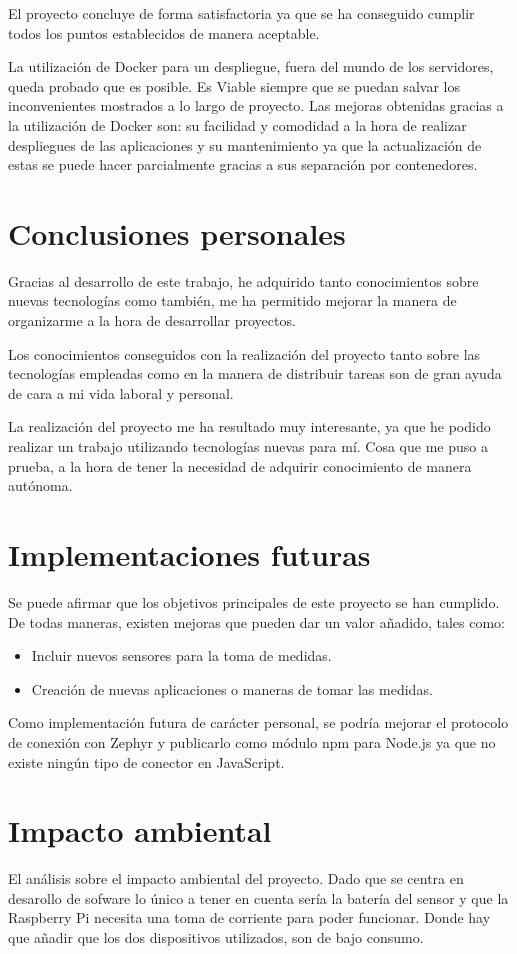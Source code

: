 El proyecto concluye de forma satisfactoria ya que se ha conseguido cumplir todos los puntos establecidos de manera aceptable. 

La utilización de Docker para un despliegue, fuera del mundo de los servidores, queda probado que es posible. Es Viable siempre que se puedan salvar los inconvenientes mostrados a lo largo de proyecto. Las mejoras obtenidas gracias a la utilización de Docker son: su facilidad y comodidad a la hora de realizar despliegues de las aplicaciones y su mantenimiento ya que la actualización de estas se puede hacer parcialmente gracias a sus separación por contenedores. 

\section{Conclusiones personales}

Gracias al desarrollo de este trabajo, he adquirido tanto conocimientos sobre
nuevas tecnologías como también, me ha permitido mejorar la manera de
organizarme a la hora de desarrollar proyectos.

\pagebreak
Los conocimientos conseguidos con la realización del proyecto tanto sobre las tecnologías empleadas como en la manera de distribuir tareas son de gran ayuda de cara a mi vida laboral y personal. 

La realización del proyecto me ha resultado muy interesante, ya que he podido realizar un trabajo utilizando tecnologías nuevas para mí. Cosa que me puso a prueba, a la hora de tener la necesidad de adquirir conocimiento de manera autónoma. 

\section{Implementaciones futuras}

Se puede afirmar que los objetivos principales de este proyecto se han cumplido.
De todas maneras, existen mejoras que pueden dar un valor añadido, tales como:

\begin{itemize}
\item Incluir nuevos sensores para la toma de medidas. 
\item Creación de nuevas aplicaciones o maneras de tomar las medidas.
\end{itemize}

Como implementación futura de carácter personal, se podría mejorar el protocolo de conexión con Zephyr y publicarlo como módulo npm para Node.js ya que no existe ningún tipo de conector en JavaScript.

\section{Impacto ambiental} 

El análisis sobre el impacto ambiental del proyecto. Dado que se centra en desarollo de sofware lo único a tener en cuenta sería la batería del sensor y que la Raspberry Pi necesita una toma de corriente para poder funcionar. Donde hay que añadir que los dos dispositivos utilizados, son de bajo consumo. 